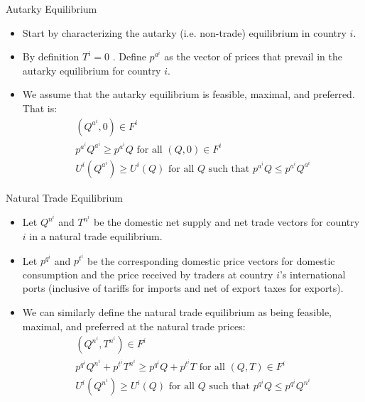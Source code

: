 \documentclass[aspectratio=169]{beamer}
\begin{document}

\begin{frame}{Autarky Equilibrium}

\begin{itemize}
    \item<1-> Start by characterizing the autarky (i.e. non-trade) equilibrium in country $ i $.
    \item<2-> By definition $ T^{i} = 0 $ .  Define $ p^{a^{i}} $ as the vector of prices that prevail in the autarky equilibrium for country $ i $.
    \item<3-> We assume that the autarky equilibrium is feasible, maximal, and preferred.  That is:
    \begin{gather}
        \left( Q^{a^{i}}, 0 \right) \in F^{i} \label{eq:autarkyfeasible} \\
        p^{a^{i}} Q^{a^{i}} \ge p^{a^{i}} Q \text{ for all } \left( Q, 0 \right) \in F^{i} \label{eq:autarkyGDPmax} \\
        U^{i}\left( Q^{a^{i}} \right) \ge U^{i}\left( Q \right) \text{ for all } Q \text{ such that } p^{a^{i}} Q \le p^{a^{i}} Q^{a^{i}} \label{eq:autarkyutilpreferred}
    \end{gather}
\end{itemize}
    
\end{frame}


\begin{frame}{Natural Trade Equilibrium}

\begin{itemize}
    \item<1-> Let $ Q^{n^{i}} $ and $ T^{n^{i}} $ be the domestic net supply and net trade vectors for country $ i $  in a natural trade equilibrium.
    \item<2-> Let $ p^{q^{i}} $ and $ p^{t^{i}} $ be the corresponding domestic price vectors for domestic consumption and the price received by traders at country $ i $’s international ports (inclusive of tariffs for imports and net of export taxes for exports).
    \item<3-> We can similarly define the natural trade equilibrium as being feasible, maximal, and preferred at the natural trade prices:
    \begin{gather}
        \left( Q^{n^{i}}, T^{n^{i}} \right) \in F^{i} \label{eq:nattradefeasible} \\
        p^{q^{i}} Q^{n^{i}} + p^{t^{i}} T^{n^{i}} \ge p^{q^{i}} Q + p^{t^{i}} T \text{ for all } \left( Q, T \right) \in F^{i} \label{eq:nattradeGDPmax} \\
        U^{i}\left( Q^{n^{i}} \right) \ge U^{i}\left( Q \right) \text{ for all } Q \text{ such that } p^{q^{i}} Q \le p^{q^{i}} Q^{n^{i}} \label{eq:nattradeutilpreferred}
    \end{gather}
\end{itemize}
    
\end{frame}
\end{document}
